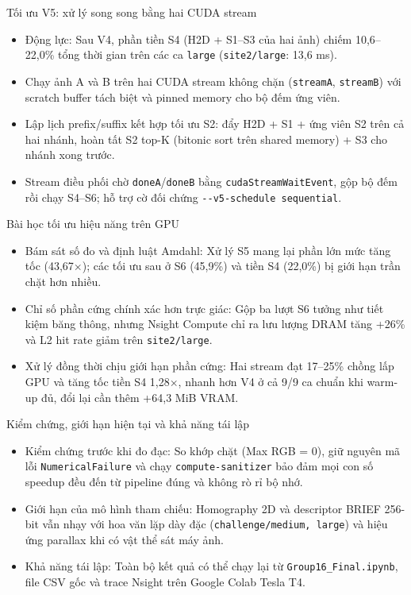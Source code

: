 \documentclass[aspectratio=169]{beamer}
\begin{document}
\begin{frame}{Tối ưu V5: xử lý song song bằng hai CUDA stream}
\begin{itemize}
\item Động lực: Sau V4, phần tiền S4 (H2D + S1--S3 của hai ảnh) chiếm 10,6--22,0\% tổng thời gian trên các ca \texttt{large} (\texttt{site2/large}: 13,6 ms).
\item Chạy ảnh A và B trên hai CUDA stream không chặn (\texttt{streamA}, \texttt{streamB}) với scratch buffer tách biệt và pinned memory cho bộ đếm ứng viên.
\item Lập lịch prefix/suffix kết hợp tối ưu S2: đẩy H2D + S1 + ứng viên S2 trên cả hai nhánh, hoàn tất S2 top-K (bitonic sort trên shared memory) + S3 cho nhánh xong trước.
\item Stream điều phối chờ \texttt{doneA}/\texttt{doneB} bằng \texttt{cudaStreamWaitEvent}, gộp bộ đếm rồi chạy S4--S6; hỗ trợ cờ đối chứng \texttt{-{}-v5-schedule sequential}.
\end{itemize}
\end{frame}

\begin{frame}{Bài học tối ưu hiệu năng trên GPU}
\begin{itemize}
\item Bám sát số đo và định luật Amdahl: Xử lý S5 mang lại phần lớn mức tăng tốc (43,67$\times$); các tối ưu sau ở S6 (45,9\%) và tiền S4 (22,0\%) bị giới hạn trần chặt hơn nhiều.
\medskip
\item Chỉ số phần cứng chính xác hơn trực giác: Gộp ba lượt S6 tưởng như tiết kiệm băng thông, nhưng Nsight Compute chỉ ra lưu lượng DRAM tăng +26\% và L2 hit rate giảm trên \texttt{site2/large}.
\medskip
\item Xử lý đồng thời chịu giới hạn phần cứng: Hai stream đạt 17--25\% chồng lấp GPU và tăng tốc tiền S4 1,28$\times$, nhanh hơn V4 ở cả 9/9 ca chuẩn khi warm-up đủ, đổi lại cần thêm +64,3 MiB VRAM.
\end{itemize}
\end{frame}

\begin{frame}{Kiểm chứng, giới hạn hiện tại và khả năng tái lập}
\begin{itemize}
\item Kiểm chứng trước khi đo đạc: So khớp chặt (Max RGB = 0), giữ nguyên mã lỗi \texttt{NumericalFailure} và chạy \texttt{compute-sanitizer} bảo đảm mọi con số speedup đều đến từ pipeline đúng và không rò rỉ bộ nhớ.
\medskip
\item Giới hạn của mô hình tham chiếu: Homography 2D và descriptor BRIEF 256-bit vẫn nhạy với hoa văn lặp dày đặc (\texttt{challenge/medium, large}) và hiệu ứng parallax khi có vật thể sát máy ảnh.
\medskip
\item Khả năng tái lập: Toàn bộ kết quả có thể chạy lại từ \texttt{Group16\_Final.ipynb}, file CSV gốc và trace Nsight trên Google Colab Tesla T4.
\end{itemize}
\end{frame}
\end{document}
